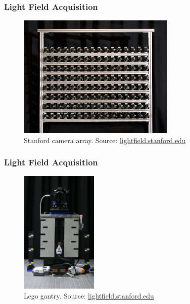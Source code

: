 \documentclass[12pt, compress]{beamer}
\begin{document}
\begin{frame}[fragile]
	\frametitle{Light Field Acquisition}
	
	\begin{figure}
		\captionsetup{font=scriptsize}
		\includegraphics[height = 6cm]{images/stanford_camera_array_2.jpg}
		\caption*{Stanford camera array. Source: \href{http://lightfield.stanford.edu}{lightfield.stanford.edu}}
	\end{figure}
	
\end{frame}

\begin{frame}[fragile]
	\frametitle{Light Field Acquisition}
	
	\begin{figure}
		\captionsetup{font=scriptsize}
		\includegraphics[height = 6cm]{images/lego_camera_gantry}
		\caption*{Lego gantry. Source: \href{http://lightfield.stanford.edu}{lightfield.stanford.edu}}
	\end{figure}
	
\end{frame}
\end{document}
